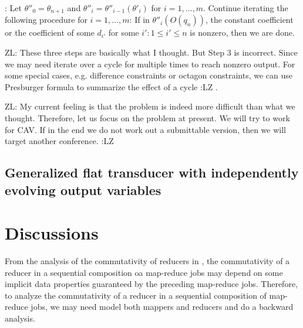 \documentclass[runningheads,a4paper]{llncs}
\newcommand{\zhilin}[1]{\color{cyan} {ZL: #1 :LZ} \color{black}}
\begin{document}
\smallskip

: Let $\theta''_0=\theta_{n+1}$ and $\theta''_i = \theta''_{i-1}(\theta'_i)$ for $i = 1, \dots, m$.  Continue iterating the following procedure for $i = 1, \dots, m$:   If in $\theta''_i(O(q_n))$, the constant coefficient or the coefficient of some $d_{i'}$ for some $i': 1 \le i' \le n$ is nonzero, then we are done. 

\zhilin{These three steps are basically what I thought. But Step 3 is incorrect. Since we may need iterate over a cycle for multiple times to reach nonzero output. For some special cases, e.g. difference constraints or octagon constraints, we can use Presburger formula to summarize the effect of a cycle}.

\zhilin{My current feeling is that the problem is indeed more difficult than what we thought. Therefore, let us focus on the problem at present. We will try to work for CAV. If in the end we do not work out a submittable version, then we will target another conference.}

\subsection{Generalized flat transducer with independently evolving output variables}

\section{Discussions}

From the analysis of the commutativity of reducers in \cite{XZZ+14}, the commutativity of a reducer in a sequential composition oa map-reduce jobs may depend on some implicit data properties guaranteed by the preceding map-reduce jobs. Therefore, to analyze the commutativity of a reducer in a sequential composition of map-reduce jobs, we may need model both mappers and reducers and do a backward analysis.





\begin{appendix}



\end{appendix}
\end{document}
